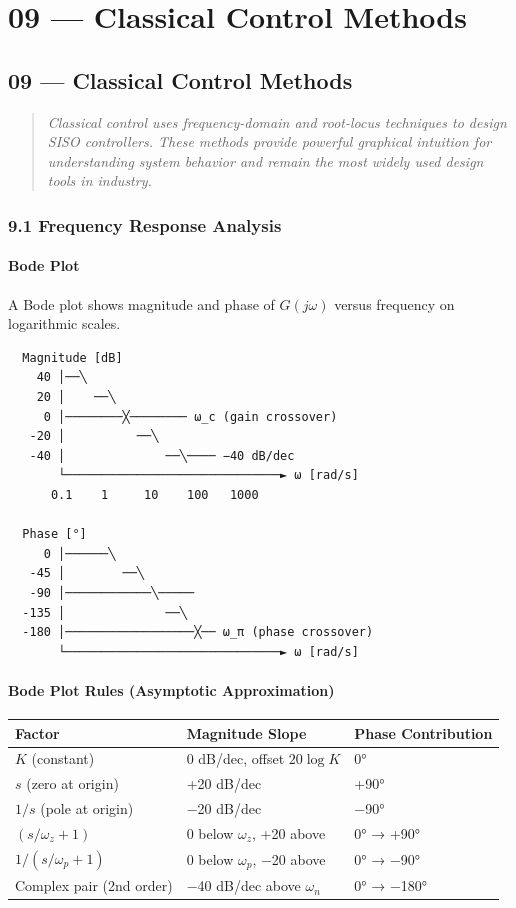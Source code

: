 \documentclass[11pt,a4paper]{book}
\begin{document}
\chapter{09 — Classical Control Methods}
\section{09 — Classical Control Methods}

\begin{quote}
\textit{Classical control uses frequency-domain and root-locus techniques to design SISO controllers. These methods provide powerful graphical intuition for understanding system behavior and remain the most widely used design tools in industry.}
\end{quote}

\medskip\noindent\hrulefill\medskip

\subsection{9.1 Frequency Response Analysis}

\subsubsection{Bode Plot}

A Bode plot shows magnitude and phase of $G(j\omega)$ versus frequency on logarithmic scales.

\begin{lstlisting}
  Magnitude [dB]
    40 │──╲
    20 │    ──╲
     0 │────────╳──────── ω_c (gain crossover)
   -20 │          ──╲
   -40 │              ──╲──── −40 dB/dec
       └──────────────────────────────► ω [rad/s]
      0.1    1     10    100   1000
       
  Phase [°]
     0 │──────╲
   -45 │        ──╲
   -90 │────────────╲─────
  -135 │              ──╲
  -180 │──────────────────╳── ω_π (phase crossover)
       └──────────────────────────────► ω [rad/s]
\end{lstlisting}

\subsubsection{Bode Plot Rules (Asymptotic Approximation)}

\begin{center}
\begin{tabular}{|l|l|l|}
\hline
Factor & Magnitude Slope & Phase Contribution \\
\hline
$K$ (constant) & 0 dB/dec, offset $20\log K$ & 0° \\
$s$ (zero at origin) & +20 dB/dec & +90° \\
$1/s$ (pole at origin) & −20 dB/dec & −90° \\
$(s/\omega_z + 1)$ & 0 below $\omega_z$, +20 above & 0° → +90° \\
$1/(s/\omega_p + 1)$ & 0 below $\omega_p$, −20 above & 0° → −90° \\
Complex pair (2nd order) & −40 dB/dec above $\omega_n$ & 0° → −180° \\
\hline
\end{tabular}
\end{center}
\end{document}
